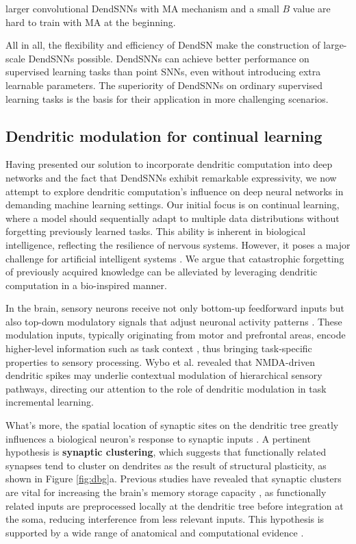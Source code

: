 larger convolutional DendSNNs with MA mechanism and a small $B$ value are hard to train with MA at the beginning.

All in all, the flexibility and efficiency of DendSN make the construction of large-scale DendSNNs possible. DendSNNs can achieve better performance on supervised learning tasks than point SNNs, even without introducing extra learnable parameters. The superiority of DendSNNs on ordinary supervised learning tasks is the basis for their application in more challenging scenarios.

\subsection*{Dendritic modulation for continual learning}
\label{subsec:results-dbg}

Having presented our solution to incorporate dendritic computation into deep networks and the fact that DendSNNs exhibit remarkable expressivity, we now attempt to explore dendritic computation's influence on deep neural networks in demanding machine learning settings. Our initial focus is on continual learning, where a model should sequentially adapt to multiple data distributions without forgetting previously learned tasks. This ability is inherent in biological intelligence, reflecting the resilience of nervous systems. However, it poses a major challenge for artificial intelligent systems \cite{goodfellow2013empirical}. We argue that catastrophic forgetting of previously acquired knowledge can be alleviated by leveraging dendritic computation in a bio-inspired manner.

In the brain, sensory neurons receive not only bottom-up feedforward inputs but also top-down modulatory signals that adjust neuronal activity patterns \cite{roth2015thalamic}. These modulation inputs, typically originating from motor and prefrontal areas, encode higher-level information such as task context \cite{atiani2009task,popovkina2022task}, thus bringing task-specific properties to sensory processing. Wybo et al. \cite{wybo2023NMDA} revealed that NMDA-driven dendritic spikes may underlie contextual modulation of hierarchical sensory pathways, directing our attention to the role of dendritic modulation in task incremental learning.

What's more, the spatial location of synaptic sites on the dendritic tree greatly influences a biological neuron's response to synaptic inputs \cite{mel1994information,bono2017modelling}. A pertinent hypothesis is \textbf{synaptic clustering}, which suggests that functionally related synapses tend to cluster on dendrites as the result of structural plasticity, as shown in Figure \ref{fig:dbg}a. Previous studies have revealed that synaptic clusters are vital for increasing the brain's memory storage capacity \cite{kastellakis2015synaptic}, as functionally related inputs are preprocessed locally at the dendritic tree before integration at the soma, reducing interference from less relevant inputs. This hypothesis is supported by a wide range of anatomical and computational evidence \cite{takahashi2012locally,cichon2015branch,limbacher2020cluster}.

